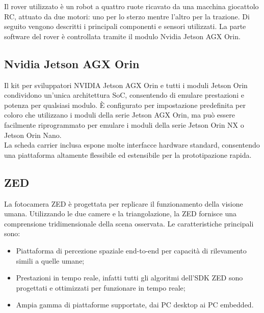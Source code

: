 \label{sec:desc_tec}
Il rover utilizzato è un robot a quattro ruote ricavato da una macchina giocattolo RC, attuato da due motori: uno per lo sterzo mentre l'altro per la trazione. Di seguito vengono descritti i principali componenti e sensori utilizzati. La parte software del rover è controllata tramite il modulo Nvidia Jetson AGX Orin.

\subsection{Nvidia Jetson AGX Orin}
Il kit per sviluppatori NVIDIA Jetson AGX Orin  \cite{Nvidia} e tutti i moduli Jetson Orin condividono un'unica architettura SoC, consentendo di emulare prestazioni e potenza per qualsiasi modulo. È configurato per impostazione predefinita per coloro che utilizzano i moduli della serie Jetson AGX Orin, ma può essere facilmente riprogrammato per emulare i moduli della serie Jetson Orin NX o Jetson Orin Nano. \\
La scheda carrier inclusa espone molte interfacce hardware standard, consentendo una piattaforma altamente flessibile ed estensibile per la prototipazione rapida.

\subsection{ZED}
La fotocamera ZED \cite{ZED} è progettata per replicare il funzionamento della visione umana. Utilizzando le due camere e la triangolazione, la ZED fornisce una comprensione tridimensionale della scena osservata.
Le caratteristiche principali sono:
\begin{itemize}
    \item Piattaforma di percezione spaziale end-to-end per capacità di rilevamento simili a quelle umane;
    \item Prestazioni in tempo reale, infatti tutti gli algoritmi dell'SDK ZED sono progettati e ottimizzati per funzionare in tempo reale;
    \item Ampia gamma di piattaforme supportate, dai PC desktop ai PC embedded.
\end{itemize}

